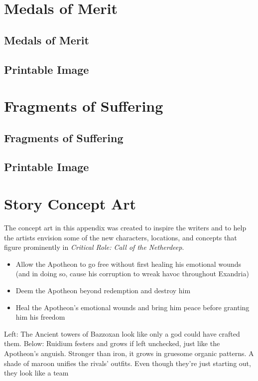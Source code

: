 \documentclass[a4paper, 11pt, bg=full, twocolumn, nooutline]{dndbook}
\begin{document}
\chapter{Medals of Merit}\label{ch:medals-of-merit-11-11}

\section{Medals of Merit}
\section{Printable Image}


\chapter{Fragments of Suffering}\label{ch:fragments-of-suffering-12-12}

\section{Fragments of Suffering}
\section{Printable Image}


\chapter{Story Concept Art}\label{ch:story-concept-art-13-13}

The concept art in this appendix was created to inspire the writers and to help the artists envision some of the new characters, locations, and concepts that figure prominently in \textit{Critical Role: Call of the Netherdeep}.
\begin{itemize}
\item Allow the Apotheon to go free without first healing his emotional wounds (and in doing so, cause his corruption to wreak havoc throughout Exandria)
\item Deem the Apotheon beyond redemption and destroy him
\item Heal the Apotheon's emotional wounds and bring him peace before granting him his freedom
\end{itemize}
Left: The Ancient towers of Bazzoxan look like only a god could have crafted them.
Below: Ruidium festers and grows if left unchecked, just like the Apotheon's anguish. Stronger than iron, it grows in gruesome organic patterns.
A shade of maroon unifies the rivals' outfits. Even though they're just starting out, they look like a team
\end{document}
